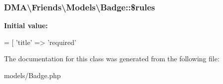 \hypertarget{classDMA_1_1Friends_1_1Models_1_1Badge_ab750ee2c75af273ca930a12b1a20b3ae}{
\subsubsection[{\$rules}]{\setlength{\rightskip}{0pt plus 5cm}D\+M\+A\textbackslash{}\+Friends\textbackslash{}\+Models\textbackslash{}\+Badge\+::\$rules}}\label{classDMA_1_1Friends_1_1Models_1_1Badge_ab750ee2c75af273ca930a12b1a20b3ae}
{\bfseries Initial value\+:}
\begin{DoxyCode}
= [ 
        \textcolor{stringliteral}{'title'} => \textcolor{stringliteral}{'required'}
\end{DoxyCode}


The documentation for this class was generated from the following file\+:\begin{DoxyCompactItemize}
\item 
models/Badge.\+php\end{DoxyCompactItemize}
